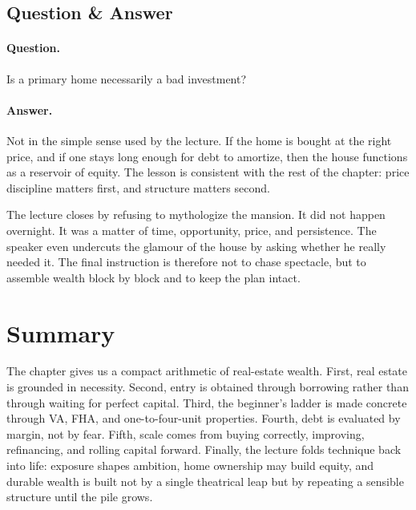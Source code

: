 \subsection{Question \& Answer}

\paragraph{Question.} Is a primary home necessarily a bad investment?

\paragraph{Answer.} Not in the simple sense used by the lecture. If the home is bought at the right price, and if one stays long enough for debt to amortize, then the house functions as a reservoir of equity. The lesson is consistent with the rest of the chapter: price discipline matters first, and structure matters second.

The lecture closes by refusing to mythologize the mansion. It did not happen overnight. It was a matter of time, opportunity, price, and persistence. The speaker even undercuts the glamour of the house by asking whether he really needed it. The final instruction is therefore not to chase spectacle, but to assemble wealth block by block and to keep the plan intact.

\section{Summary}

The chapter gives us a compact arithmetic of real-estate wealth. First, real estate is grounded in necessity. Second, entry is obtained through borrowing rather than through waiting for perfect capital. Third, the beginner's ladder is made concrete through VA, FHA, and one-to-four-unit properties. Fourth, debt is evaluated by margin, not by fear. Fifth, scale comes from buying correctly, improving, refinancing, and rolling capital forward. Finally, the lecture folds technique back into life: exposure shapes ambition, home ownership may build equity, and durable wealth is built not by a single theatrical leap but by repeating a sensible structure until the pile grows.